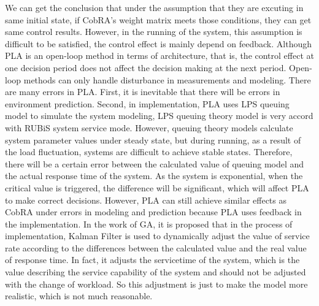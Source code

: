 \documentclass[sigconf]{acmart}
\begin{document}
We can get the conclusion that under the assumption that they are excuting in same initial state, if CobRA's weight matrix meets those conditions, they can get same control results. However, in the running of the system, this assumption is difficult to be satisfied, the control effect is mainly depend on feedback.
Although PLA is an open-loop method in terms of architecture, that is, the control effect at one decision period does not affect the decision making at the next period. Open-loop methods can only handle disturbance in measurements and modeling. There are many errors in PLA. First, it is inevitable that there will be errors in environment prediction. Second, in implementation, PLA uses LPS queuing  model to simulate the system modeling, LPS queuing theory model is very accord with RUBiS system service mode. However, queuing theory models calculate system parameter values under steady state, but during running, as a result of the load fluctuation, systems are difficult to achieve stable states.
Therefore, there will be a certain error between the calculated value of queuing model and the actual response time of the system. As the system is exponential, when the critical value is triggered, the difference will be significant, which will affect PLA to make correct decisions. However, PLA can still achieve similar effects as CobRA under errors in modeling and prediction because PLA uses feedback in the implementation.
In the work of GA\cite{thesis}, it is proposed that in the process of implementation, Kalman Filter is used to dynamically adjust the value of service rate according to the differences between the calculated value and the real value of response time. In fact, it adjusts the servicetime of the system, which is the value describing the service capability of the system and should not be adjusted with the change of workload. So this adjustment is just to make the model more realistic, which is not much reasonable.
\end{document}
